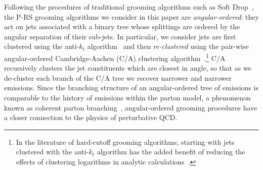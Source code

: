 Following the procedures of traditional grooming algorithms such as Soft Drop~\cite{Larkoski:2014wba}, the P-RS grooming algorithms we consider in this paper are \textit{angular-ordered}:
%
they act on jets associated with a binary tree whose splittings are ordered by the angular separation of their sub-jets.
%
In particular, we consider jets are first clustered using the anti-\(k_t\) algorithm~\cite{Cacciari:2008gp} and then \textit{re-clustered} using the pair-wise angular-ordered Cambridge-Aachen (C/A) clustering algorithm~\cite{Dokshitzer:1997in}.\footnote{
In the literature of hard-cutoff grooming algorithms, starting with jets clustered with the anti-\(k_t\) algorithm has the added benefit of reducing the effects of clustering logarithms in analytic calculations~\cite{Larkoski:2014wba}.
}
%
C/A recursively clusters the jet constituents which are closest in angle, so that as we de-cluster each branch of the C/A tree we recover narrower and narrower emissions.
%
Since the branching structure of an angular-ordered tree of emissions is comparable to the history of emissions within the parton model, a phenomenon known as coherent parton branching~\cite{Collins:2011zzd}, angular-ordered grooming procedures have a closer connection to the physics of perturbative QCD.

